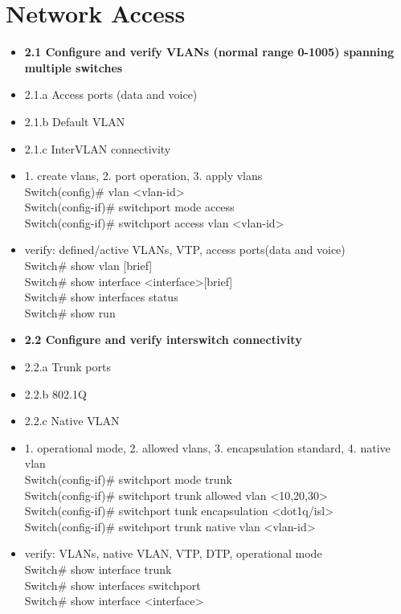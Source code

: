 \documentclass{article}
\begin{document}
\section{Network Access}
\begin{itemize}
  \item \textbf{2.1 Configure and verify VLANs (normal range 0-1005) spanning multiple switches}
  \item 2.1.a Access ports (data and voice)
  \item 2.1.b Default VLAN
  \item 2.1.c InterVLAN connectivity
	\item[] 1. create vlans, 2. port operation, 3. apply vlans\\
		Switch(config)\# vlan \textless vlan-id\textgreater\\
		Switch(config-if)\# switchport mode access\\
		Switch(config-if)\# switchport access vlan \textless vlan-id\textgreater
  	\item[] verify: defined/active VLANs, VTP, access ports(data and voice)\\
  		Switch\# show vlan [brief]\\
  		Switch\# show interface \textless interface\textgreater [brief]\\
  		Switch\# show interfaces status\\
  		Switch\# show run
  	
  \item \textbf{2.2 Configure and verify interswitch connectivity}
  \item 2.2.a Trunk ports
  \item 2.2.b 802.1Q
  \item 2.2.c Native VLAN
  	\item[] 1. operational mode, 2. allowed vlans, 3. encapsulation standard, 4. native vlan\\
  		Switch(config-if)\# switchport mode trunk\\
  		Switch(config-if)\# switchport trunk allowed vlan \textless 10,20,30\textgreater\\
  		Switch(config-if)\# switchport tunk encapsulation \textless dot1q/isl\textgreater\\
  		Switch(config-if)\# switchport trunk native vlan \textless vlan-id\textgreater
  	\item[] verify: VLANs, native VLAN, VTP, DTP, operational mode \\
  		Switch\# show interface trunk\\
  		Switch\# show interfaces switchport\\
  		Switch\# show interface \textless interface\textgreater
  		

\end{itemize}
\end{document}
